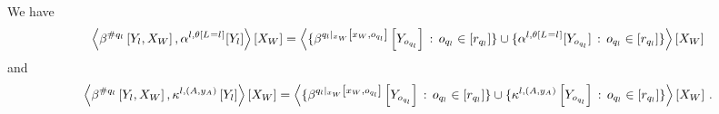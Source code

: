 \begin{lemma}
    We have
    \begin{align*}
        \left\langle \beta^{\#q_{l}}\left[Y_{l},X_{W}\right],\alpha^{l,\theta\left[L_{}=l_{}\right]}[Y_{l}]\right\rangle \left[ X_{W} \right]
        = \left\langle 
            \{\beta^{{q_{l}}|_{x_{W}} \left[x_{W},o_{q_{l}}\right]}\left[Y_{o_{q_{l}}}\right] \,:\, o_{q_{l}}\in[r_{q_{l}}]\}
            \cup
            \{\alpha^{l,\theta\left[L_{}=l_{}\right]}[Y_{o_{q_{l}}}] \,:\, o_{q_{l}}\in[r_{q_{l}}]\}
        \right\rangle \left[ X_{W} \right]
    \end{align*}
    and
    \begin{align*}
        \left\langle \beta^{\#q_{l}}\left[Y_{l},X_{W}\right],\kappa^{l,(A,y_{A})}\left[Y_{l}\right]\right\rangle \left[ X_{W} \right]
        = \left\langle 
            \{\beta^{{q_{l}}|_{x_{W}} \left[x_{W},o_{q_{l}}\right]}\left[Y_{o_{q_{l}}}\right] \,:\, o_{q_{l}}\in[r_{q_{l}}]\}
            \cup
            \{\kappa^{l,(A,y_{A})}\left[Y_{o_{q_{l}}}\right] \,:\, o_{q_{l}}\in[r_{q_{l}}]\}
        \right\rangle \left[ X_{W} \right] \, .
    \end{align*}
\end{lemma}
